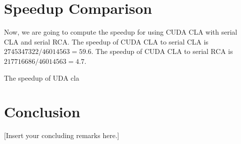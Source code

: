 \documentclass[11pt]{article}
\begin{document}
\section{Speedup Comparison}
Now, we are going to compute the speedup for using CUDA CLA with serial CLA and serial RCA. 
The speedup of CUDA CLA to serial CLA is $2745347322 / 46014563 = 59.6$. 
The speedup of CUDA CLA to serial RCA is $217716686 / 46014563 = 4.7$.

The speedup of UDA cla 

\section{Conclusion}

[Insert your concluding remarks here.]
\end{document}
